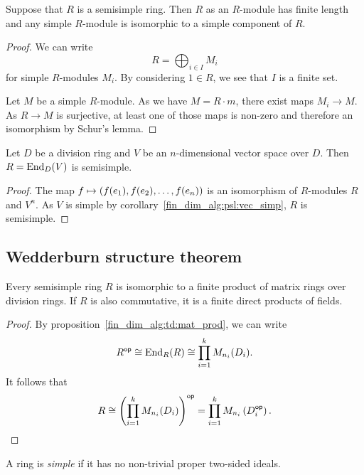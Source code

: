 \begin{posledica}
Suppose that $R$ is a semisimple ring. Then $R$ as an $R$-module
has finite length and any simple $R$-module is isomorphic to a
simple component of $R$.
\end{posledica}

\begin{proof}
We can write
\[
R = \bigoplus_{i \in I} M_i
\]
for simple $R$-modules $M_i$. By considering $1 \in R$, we see that
$I$ is a finite set.

Let $M$ be a simple $R$-module. As we have $M = R \cdot m$, there
exist maps $M_i \to M$. As $R \to M$ is surjective, at least one
of those maps is non-zero and therefore an isomorphism by Schur's
lemma.
\end{proof}

\begin{trditev}
Let $D$ be a division ring and $V$ be an $n$-dimensional vector
space over $D$. Then $R = \operatorname{End}_D(V)$ is semisimple.
\end{trditev}

\begin{proof}
The map $f \mapsto \left(f(e_1), f(e_2), \dots, f(e_n)\right)$ is an
isomorphism of $R$-modules $R$ and $V^n$. As $V$ is simple by
corollary~\ref{fin_dim_alg:psl:vec_simp}, $R$ is semisimple.
\end{proof}

\newpage

\subsection{Wedderburn structure theorem}

\begin{izrek}[Wedderburn]
Every semisimple ring $R$ is isomorphic to a finite product of
matrix rings over division rings. If $R$ is also commutative, it is
a finite direct products of fields.
\end{izrek}

\begin{proof}
By proposition~\ref{fin_dim_alg:td:mat_prod}, we can write
\[
R^{\mathsf{op}} \cong \operatorname{End}_R(R) \cong \prod_{i=1}^k M_{n_i}(D_i).
\]
It follows that
\[
R \cong
\left(\prod_{i=1}^k M_{n_i}(D_i)\right)^{\mathsf{op}} =
\prod_{i=1}^k M_{n_i} \left(D_i^{\mathsf{op}}\right). \qedhere
\]
\end{proof}


\begin{definicija}
A ring is \emph{simple} if it has no non-trivial
proper two-sided ideals.
\end{definicija}

